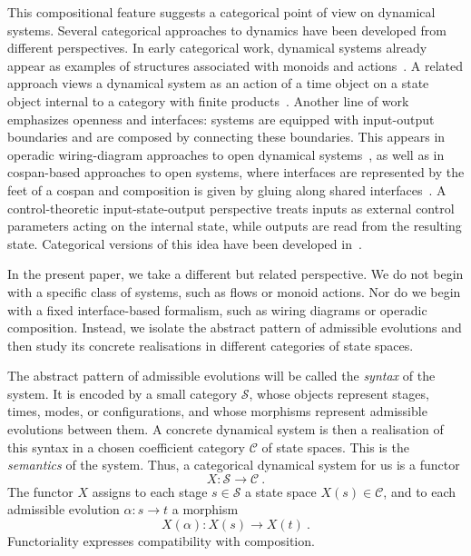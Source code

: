 \documentclass[a4paper,reqno,oneside]{amsart}
\theoremstyle{definition}
\theoremstyle{remark}
\numberwithin{equation}{section}
\begin{document}
This compositional feature suggests a categorical point of view on dynamical systems. Several categorical approaches to dynamics have been developed from different perspectives. In early categorical work, dynamical systems already appear as examples of structures associated with monoids and actions~\cite{La86}. A related approach views a dynamical system as an action of a time object on a state object internal to a category with finite products~\cite{BKPSS17}. Another line of work emphasizes openness and interfaces: systems are equipped with input-output boundaries and are composed by connecting these boundaries. This appears in operadic wiring-diagram approaches to open dynamical systems~\cite{VSL15}, as well as in cospan-based approaches to open systems, where interfaces are represented by the feet of a cospan and composition is given by gluing along shared interfaces~\cite{BC19,BCV21}. A control-theoretic input-state-output perspective treats inputs as external
control parameters acting on the internal state, while outputs are read from the resulting state. Categorical versions of this idea have been developed in~\cite{BE14,My20,My23,LM25}.




\medskip


In the present paper, we take a different but related perspective. We do not begin with a specific class of systems, such as flows or monoid actions. Nor do we begin with a fixed interface-based formalism, such as wiring diagrams or operadic composition. Instead, we isolate the abstract pattern of admissible evolutions and then study its concrete realisations in different categories of state spaces.


The abstract pattern of admissible evolutions will be called the \textit{syntax} of
the system. It is encoded by a small category $\mathcal S$, whose objects represent stages, times, modes, or configurations, and whose
morphisms represent admissible evolutions between them. A concrete dynamical
system is then a realisation of this syntax in a chosen coefficient category $\mathcal C$ of state spaces. This is the \textit{semantics} of the system. Thus, a categorical dynamical system for us is a functor
\begin{equation}
    X\colon \mathcal S\longrightarrow \mathcal C \ .
\end{equation}
The functor $X$ assigns to each stage $s\in\mathcal S$ a state space
$X(s)\in\mathcal C$, and to each admissible evolution
$\alpha\colon s\to t$ a morphism
\begin{equation}
    X(\alpha)\colon X(s)\to X(t) \ .
\end{equation}
Functoriality expresses compatibility with composition.
\end{document}
